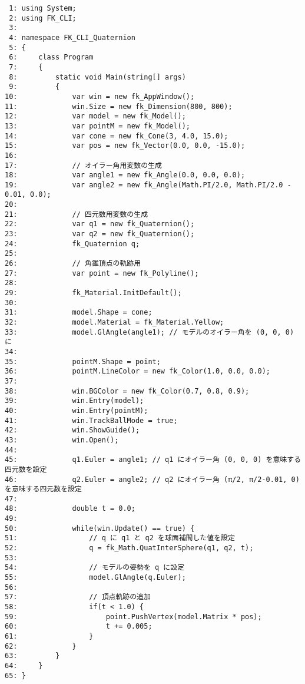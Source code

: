 \begin{breakbox}
\begin{small}
\begin{verbatim}
 1: using System;
 2: using FK_CLI;
 3: 
 4: namespace FK_CLI_Quaternion
 5: {
 6:     class Program
 7:     {
 8:         static void Main(string[] args)
 9:         {
10:             var win = new fk_AppWindow();
11:             win.Size = new fk_Dimension(800, 800);
12:             var model = new fk_Model();
13:             var pointM = new fk_Model();
14:             var cone = new fk_Cone(3, 4.0, 15.0);
15:             var pos = new fk_Vector(0.0, 0.0, -15.0);
16: 
17:             // オイラー角用変数の生成
18:             var angle1 = new fk_Angle(0.0, 0.0, 0.0);
19:             var angle2 = new fk_Angle(Math.PI/2.0, Math.PI/2.0 - 0.01, 0.0);
20: 
21:             // 四元数用変数の生成
22:             var q1 = new fk_Quaternion();
23:             var q2 = new fk_Quaternion();
24:             fk_Quaternion q;
25: 
26:             // 角錐頂点の軌跡用
27:             var point = new fk_Polyline();
28: 
29:             fk_Material.InitDefault();
30: 
31:             model.Shape = cone;
32:             model.Material = fk_Material.Yellow;
33:             model.GlAngle(angle1); // モデルのオイラー角を (0, 0, 0) に
34: 
35:             pointM.Shape = point;
36:             pointM.LineColor = new fk_Color(1.0, 0.0, 0.0);
37: 
38:             win.BGColor = new fk_Color(0.7, 0.8, 0.9);
39:             win.Entry(model);
40:             win.Entry(pointM);
41:             win.TrackBallMode = true;
42:             win.ShowGuide();
43:             win.Open();
44: 
45:             q1.Euler = angle1; // q1 にオイラー角 (0, 0, 0) を意味する四元数を設定
46:             q2.Euler = angle2; // q2 にオイラー角 (π/2, π/2-0.01, 0) を意味する四元数を設定
47: 
48:             double t = 0.0;
49: 
50:             while(win.Update() == true) {
51:                 // q に q1 と q2 を球面補間した値を設定
52:                 q = fk_Math.QuatInterSphere(q1, q2, t);
53: 
54:                 // モデルの姿勢を q に設定
55:                 model.GlAngle(q.Euler);
56: 
57:                 // 頂点軌跡の追加
58:                 if(t < 1.0) {
59:                     point.PushVertex(model.Matrix * pos);
60:                     t += 0.005;
61:                 }
62:             }
63:         }
64:     }
65: }
\end{verbatim}
\end{small}
\end{breakbox}
